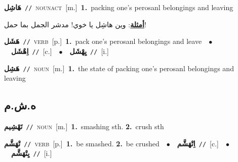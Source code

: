 \documentclass[10pt,a4paper,twoside]{article} %
\begin{document}
\begin{multicols}{2}
{\setlength\topsep{0pt}\textbf{\foreignlanguage{arabic}{هَاشِل}}\ {\color{gray}\texttt{//}\color{black}}\ \textsc{noun\textunderscore act}\ [m.]\ \textbf{1.}~packing one's perosanl belongings and leaving\  \begin{flushright}\color{gray}\foreignlanguage{arabic}{\textbf{\underline{\foreignlanguage{arabic}{أمثلة}}}: وين هاشِل يا خوي! مدشر الجمل بما حمل!}\end{flushright}\color{black}} \vspace{2mm}

{\setlength\topsep{0pt}\textbf{\foreignlanguage{arabic}{هَشَل}}\ {\color{gray}\texttt{//}\color{black}}\ \textsc{verb}\ [p.]\ \textbf{1.}~pack one's perosanl belongings and leave\ \ $\bullet$\ \ \setlength\topsep{0pt}\textbf{\foreignlanguage{arabic}{اِهْشَل}}\ {\color{gray}\texttt{//}\color{black}}\ [c.]\ \ $\bullet$\ \ \setlength\topsep{0pt}\textbf{\foreignlanguage{arabic}{يِهْشَل}}\ {\color{gray}\texttt{//}\color{black}}\ [i.]\ } \vspace{2mm}

{\setlength\topsep{0pt}\textbf{\foreignlanguage{arabic}{هَشِل}}\ {\color{gray}\texttt{//}\color{black}}\ \textsc{noun}\ [m.]\ \textbf{1.}~the state of packing one's perosanl belongings and leaving\ } \vspace{2mm}

\vspace{-3mm}
\subsection*{\color{blue}\foreignlanguage{arabic}{ه.ش.م}\color{blue}{}} 

{\setlength\topsep{0pt}\textbf{\foreignlanguage{arabic}{تَهْشِيم}}\ {\color{gray}\texttt{//}\color{black}}\ \textsc{noun}\ [m.]\ \textbf{1.}~smashing sth.  \textbf{2.}~crush sth\ } \vspace{2mm}

{\setlength\topsep{0pt}\textbf{\foreignlanguage{arabic}{تْهَشَّم}}\ {\color{gray}\texttt{//}\color{black}}\ \textsc{verb}\ [p.]\ \textbf{1.}~be smashed.  \textbf{2.}~be crushed\ \ $\bullet$\ \ \setlength\topsep{0pt}\textbf{\foreignlanguage{arabic}{اِتْهَشَّم}}\ {\color{gray}\texttt{//}\color{black}}\ [c.]\ \ $\bullet$\ \ \setlength\topsep{0pt}\textbf{\foreignlanguage{arabic}{يِتْهَشَّم}}\ {\color{gray}\texttt{//}\color{black}}\ [i.]\ } \vspace{2mm}


\end{multicols}
\end{document}
